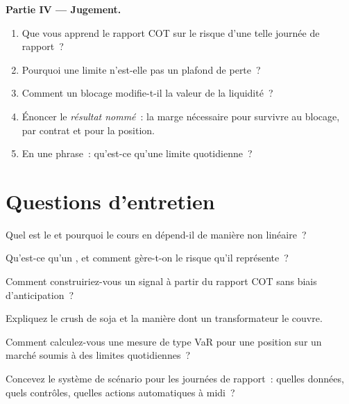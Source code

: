 \begin{problem}
\medskip\noindent\textbf{Partie IV --- Jugement.}
\begin{enumerate}[resume]
\item Que vous apprend le rapport COT sur le risque d'une telle journée de rapport~?
\item Pourquoi une limite n'est-elle pas un plafond de perte~?
\item Comment un blocage modifie-t-il la valeur de la liquidité~?
\item Énoncer le \emph{résultat nommé}~: la marge nécessaire pour survivre au blocage, par contrat et pour la position.
\item En une phrase~: qu'est-ce qu'une limite quotidienne~?
\end{enumerate}
\end{problem}

\section{Questions d'entretien}

\begin{interviewq}\label{iq:m3:agriculturals-and-softs:1}
Quel est le  et pourquoi le cours en dépend-il de manière non linéaire~?
\end{interviewq}

\begin{interviewq}\label{iq:m3:agriculturals-and-softs:2}
Qu'est-ce qu'un , et comment gère-t-on le risque qu'il représente~?
\end{interviewq}

\begin{interviewq}\label{iq:m3:agriculturals-and-softs:3}
Comment construiriez-vous un signal à partir du rapport COT sans biais d'anticipation~?
\end{interviewq}

\begin{interviewq}\label{iq:m3:agriculturals-and-softs:4}
Expliquez le crush de soja et la manière dont un transformateur le couvre.
\end{interviewq}

\begin{interviewq}\label{iq:m3:agriculturals-and-softs:5}
Comment calculez-vous une mesure de type VaR pour une position sur un marché soumis à des limites quotidiennes~?
\end{interviewq}

\begin{interviewq}\label{iq:m3:agriculturals-and-softs:6}
Concevez le système de scénario pour les journées de rapport~: quelles données, quels contrôles, quelles actions automatiques à midi~?
\end{interviewq}
